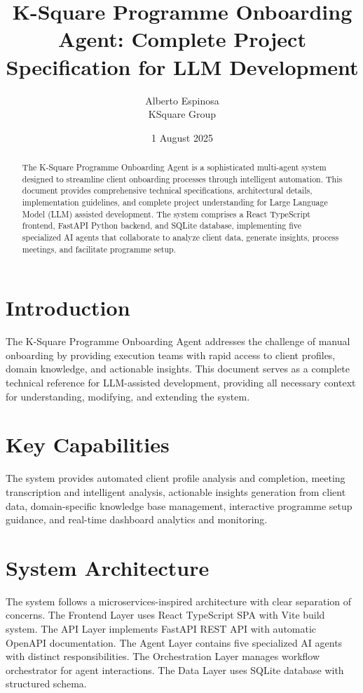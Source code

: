\documentclass{article}
\title{K-Square Programme Onboarding Agent: Complete Project Specification for LLM Development}
\author{Alberto Espinosa \\ KSquare Group}
\date{1 August 2025}
\begin{document}
\maketitle

\begin{abstract}
The K-Square Programme Onboarding Agent is a sophisticated multi-agent system designed to streamline client onboarding processes through intelligent automation. This document provides comprehensive technical specifications, architectural details, implementation guidelines, and complete project understanding for Large Language Model (LLM) assisted development. The system comprises a React TypeScript frontend, FastAPI Python backend, and SQLite database, implementing five specialized AI agents that collaborate to analyze client data, generate insights, process meetings, and facilitate programme setup.
\end{abstract}

\section{Introduction}
The K-Square Programme Onboarding Agent addresses the challenge of manual onboarding by providing execution teams with rapid access to client profiles, domain knowledge, and actionable insights. This document serves as a complete technical reference for LLM-assisted development, providing all necessary context for understanding, modifying, and extending the system.

\section{Key Capabilities}
The system provides automated client profile analysis and completion, meeting transcription and intelligent analysis, actionable insights generation from client data, domain-specific knowledge base management, interactive programme setup guidance, and real-time dashboard analytics and monitoring.

\section{System Architecture}
The system follows a microservices-inspired architecture with clear separation of concerns. The Frontend Layer uses React TypeScript SPA with Vite build system. The API Layer implements FastAPI REST API with automatic OpenAPI documentation. The Agent Layer contains five specialized AI agents with distinct responsibilities. The Orchestration Layer manages workflow orchestrator for agent interactions. The Data Layer uses SQLite database with structured schema.
\end{document}
